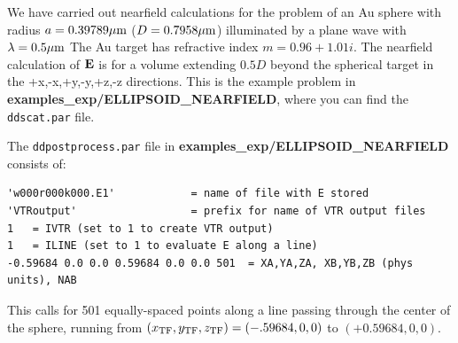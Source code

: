 We have carried out nearfield calculations for the problem of
an Au sphere with
radius $a=0.39789{\mu{\rm m}}$ ($D=0.7958{\mu{\rm m}}$)
illuminated by a plane wave with $\lambda=0.5{\mu{\rm m}}$
The Au
target has refractive index $m=0.96+1.01i$.
The nearfield calculation of ${\bf E}$ is for a volume extending $0.5D$ beyond
the spherical target in the
+x,-x,+y,-y,+z,-z directions.
This is the example problem in {\bf examples\_exp/ELLIPSOID\_NEARFIELD},
where you can find the {\tt ddscat.par} file.

The {\tt ddpostprocess.par} file in 
{\bf examples\_exp/ELLIPSOID\_NEARFIELD} consists
of: 
{\footnotesize\begin{verbatim}
'w000r000k000.E1'            = name of file with E stored
'VTRoutput'                  = prefix for name of VTR output files
1   = IVTR (set to 1 to create VTR output)
1   = ILINE (set to 1 to evaluate E along a line)
-0.59684 0.0 0.0 0.59684 0.0 0.0 501  = XA,YA,ZA, XB,YB,ZB (phys units), NAB
\end{verbatim}}
This calls for 501 equally-spaced points along a line passing through the
center of the sphere, running from
$(x_{\rm TF},y_{\rm TF},z_{\rm TF})=(-.59684,0,0)$ to $(+0.59684,0,0)$.

